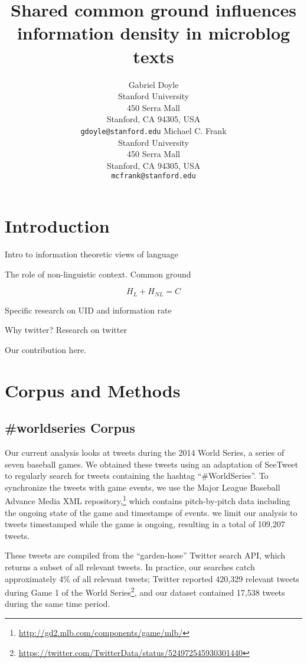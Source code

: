 \documentclass[11pt,letterpaper]{article}
\title{Shared common ground influences information density in microblog texts\Thanks{Thanks to...}}
\author{Gabriel Doyle\\
	    Stanford University\\
	    450 Serra Mall\\
	    Stanford, CA 94305, USA\\
	    {\tt gdoyle@stanford.edu}
	  \And
          Michael C. Frank\\
	    Stanford University\\
	    450 Serra Mall\\
	    Stanford, CA 94305, USA\\
	    {\tt mcfrank@stanford.edu}}
\date{}
\begin{document}
\maketitle
\begin{abstract}


\end{abstract}

\section{Introduction}

Intro to information theoretic views of language \cite{genzel2002}

The role of non-linguistic context. Common ground \cite{clark1996} \cite{brennan1990}

\begin{equation}
H_L+ H_{NL} = C
\end{equation}

Specific research on UID and information rate \cite{qian2012} \cite{levy2007}

Why twitter? Research on twitter

Our contribution here. 



\section{Corpus and Methods}

\subsection{\#worldseries Corpus}
Our current analysis looks at tweets during the 2014 World Series, a series of seven baseball games.  We obtained these tweets using an adaptation of SeeTweet \cite{doyle2014} to regularly search for tweets containing the hashtag ``\#WorldSeries''.  To synchronize the tweets with game events, we use the Major League Baseball Advance Media XML repository,\footnote{\url{http://gd2.mlb.com/components/game/mlb/}} which contains pitch-by-pitch data including the ongoing state of the game and timestamps of events. we limit our analysis to tweets timestamped while the game is ongoing, resulting in a total of 109,207 tweets.

These tweets are compiled from the ``garden-hose'' Twitter search API, which returns a subset of all relevant tweets. In practice, our searches catch approximately 4\% of all relevant tweets; Twitter reported 420,329 relevant tweets during Game 1 of the World Series\footnote{\url{https://twitter.com/TwitterData/status/524972545930301440}}, and our dataset contained 17,538 tweets during the same time period.
\end{document}
